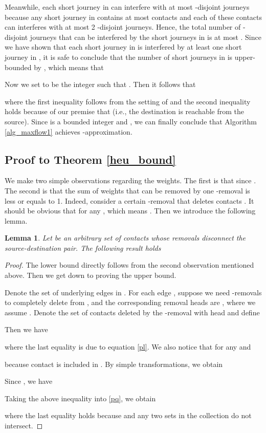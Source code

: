 \documentclass[10pt, conference, letterpaper]{IEEEtran}
\newtheorem{lemma}{Lemma}
\begin{document}
Meanwhile, each short journey in  can interfere with at most  -disjoint journeys because any short journey in  contains at most  contacts and each of these contacts can interferes with at most 2 -disjoint journeys. Hence, the total number of -disjoint journeys that can be interfered by the short journeys in  is at most . Since we have shown that each short journey in  is interfered by at least one short journey in , it is safe to conclude that the number of short journeys in  is upper-bounded by , which means that

Now we set  to be the integer such that . Then it follows that

where the first inequality follows from the setting of  and the second inequality holds because of our premise that  (i.e., the destination is reachable from the source). Since  is a bounded integer and , we can finally conclude that Algorithm \ref{alg_maxflow1} achieves -approximation.
\subsection{Proof to Theorem \ref{heu_bound}}\label{proof_heu_bound}
We  make two simple observations regarding the weights. The first is that  since . The second is that the sum of weights that can be removed by one -removal is less or equals to 1. Indeed, consider a certain -removal that deletes contacts . It should be obvious that  for any , which means . Then we introduce the following lemma.
\begin{lemma}\label{heu_lemma}
 Let  be an arbitrary set of contacts whose removals disconnect the source-destination pair. The following result holds

\end{lemma}
\begin{proof}
The lower bound directly follows from the second observation mentioned above. Then we get down to proving the upper bound.

Denote  the set of underlying edges in . For each edge , suppose we need  -removals to completely delete  from , and the corresponding removal heads are , where we assume . Denote  the set of contacts deleted by the -removal with head  and define

Then we have

where the last equality is due to equation \eqref{pl}. We also notice that for any  and 

because contact  is included in . By simple transformations, we obtain

Since , we have

Taking the above inequality into \eqref{pq}, we obtain

where the last equality holds because  and any two sets in the collection  do not intersect.
\end{proof}
\end{document}
